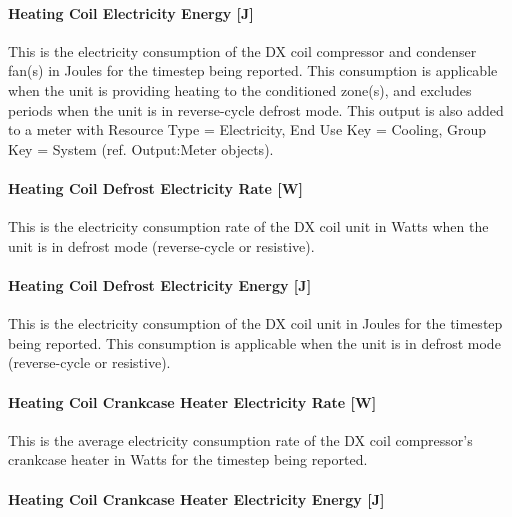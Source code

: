 \paragraph{Heating Coil Electricity Energy {[}J{]}}\label{heating-coil-electric-energy-j-3}

This is the electricity consumption of the DX coil compressor and condenser fan(s) in Joules for the timestep being reported. This consumption is applicable when the unit is providing heating to the conditioned zone(s), and excludes periods when the unit is in reverse-cycle defrost mode. This output is also added to a meter with Resource Type = Electricity, End Use Key = Cooling, Group Key = System (ref. Output:Meter objects).

\paragraph{Heating Coil Defrost Electricity Rate {[}W{]}}\label{heating-coil-defrost-electric-power-w}

This is the electricity consumption rate of the DX coil unit in Watts when the unit is in defrost mode (reverse-cycle or resistive).

\paragraph{Heating Coil Defrost Electricity Energy {[}J{]}}\label{heating-coil-defrost-electric-energy-j}

This is the electricity consumption of the DX coil unit in Joules for the timestep being reported. This consumption is applicable when the unit is in defrost mode (reverse-cycle or resistive).

\paragraph{Heating Coil Crankcase Heater Electricity Rate {[}W{]}}\label{heating-coil-crankcase-heater-electric-power-w}

This is the average electricity consumption rate of the DX coil compressor's crankcase heater in Watts for the timestep being reported.

\paragraph{Heating Coil Crankcase Heater Electricity Energy {[}J{]}}\label{heating-coil-crankcase-heater-electric-energy-j}

